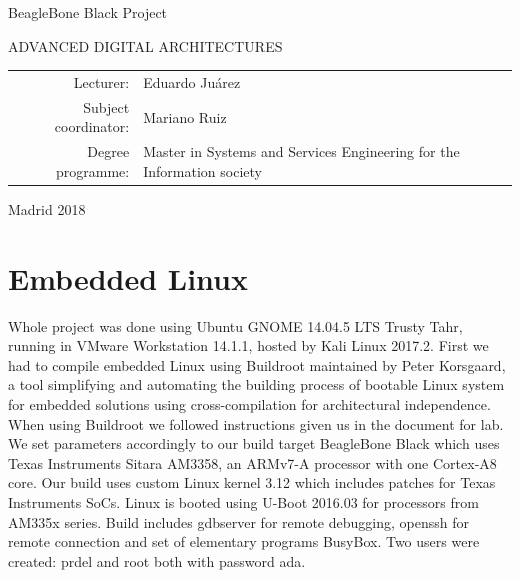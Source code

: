 \documentclass[UKenglish,10pt,a4paper]{report}
\let\openright=\clearpage
\begin{document}
\begin{titlepage}
\begin{center}
\vspace{10mm}

{\LARGE\bfseries } BeagleBone Black Project

\vfill

ADVANCED DIGITAL ARCHITECTURES

\vfill

\begin{tabular}{rl}

Lecturer: & Eduardo Juárez  \\
\noalign{\vspace{2mm}}
Subject coordinator: & Mariano Ruiz \\
\noalign{\vspace{2mm}}
Degree programme: & Master in Systems and Services Engineering for the Information society \\
\end{tabular}

\vfill

Madrid 2018

\end{center}
\end{titlepage}
\newpage



\openright

\noindent






\openright
\pagestyle{plain}
\setcounter{page}{1}
\tableofcontents


\chapter{Embedded Linux}
Whole project was done using Ubuntu GNOME 14.04.5 LTS Trusty Tahr, running in VMware Workstation 14.1.1, hosted by Kali Linux 2017.2. First we had to compile embedded Linux using Buildroot maintained by Peter Korsgaard, a tool simplifying and automating the building process of bootable Linux system for embedded solutions using cross-compilation for architectural independence. When using Buildroot we followed instructions given us in the document for lab. We set parameters accordingly to our build target BeagleBone Black which uses Texas Instruments Sitara AM3358, an ARMv7-A processor with one Cortex-A8  core. Our build uses custom Linux kernel 3.12 which includes patches for Texas Instruments SoCs. Linux is booted using U-Boot 2016.03 for processors from AM335x series. Build includes gdbserver for remote debugging, openssh for remote connection and set of elementary programs BusyBox. Two users were created: prdel and root both with password ada.
\end{document}
